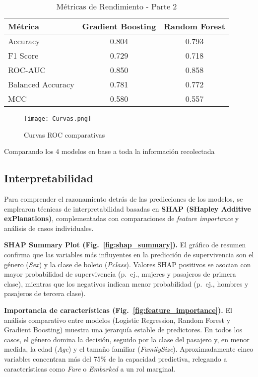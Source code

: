 \documentclass[conference]{IEEEtran}
\begin{document}
\begin{table}[h!]
    \centering
    \caption{Métricas de Rendimiento - Parte 2}
    \begin{tabular}{lcc}
        \toprule
        \textbf{Métrica} & \textbf{Gradient Boosting} & \textbf{Random Forest} \\
        \midrule
        Accuracy & 0.804 & 0.793 \\
        F1 Score & 0.729 & 0.718 \\
        ROC-AUC & 0.850 & 0.858 \\
        Balanced Accuracy & 0.781 & 0.772 \\
        MCC & 0.580 & 0.557 \\
        \bottomrule
    \end{tabular}
\end{table}

\begin{figure}[h!]
    \centering
    \texttt{[image: Curvas.png]}
    \caption{Curvas ROC comparativas}
    \label{fig:etiqueta_de_la_imagen}
\end{figure}


Comparando los 4 modelos en base a toda la información recolectada


\subsection{Interpretabilidad}

Para comprender el razonamiento detrás de las predicciones de los modelos, se emplearon técnicas de interpretabilidad basadas en \textbf{SHAP (SHapley Additive exPlanations)}, complementadas con comparaciones de \textit{feature importance} y análisis de casos individuales. 

\textbf{SHAP Summary Plot (Fig.~\ref{fig:shap_summary}).}
El gráfico de resumen confirma que las variables más influyentes en la predicción de supervivencia son el género (\textit{Sex}) y la clase de boleto (\textit{Pclass}). Valores SHAP positivos se asocian con mayor probabilidad de supervivencia (p.~ej., mujeres y pasajeros de primera clase), mientras que los negativos indican menor probabilidad (p.~ej., hombres y pasajeros de tercera clase). 

\textbf{Importancia de características (Fig.~\ref{fig:feature_importance}).}
El análisis comparativo entre modelos (Logistic Regression, Random Forest y Gradient Boosting) muestra una jerarquía estable de predictores. En todos los casos, el género domina la decisión, seguido por la clase del pasajero y, en menor medida, la edad (\textit{Age}) y el tamaño familiar (\textit{FamilySize}). Aproximadamente cinco variables concentran más del 75\% de la capacidad predictiva, relegando a características como \textit{Fare} o \textit{Embarked} a un rol marginal. 
\end{document}
